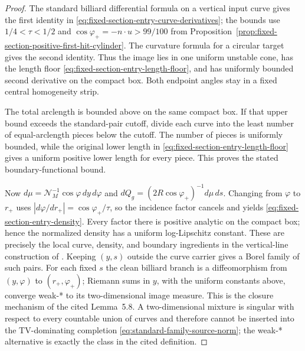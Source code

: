 \documentclass[11pt]{article}
\begin{document}
\begin{proof}
The standard billiard differential formula on a vertical input curve gives
the first identity in
\eqref{eq:fixed-section-entry-curve-derivatives}; the bounds use
$1/4<\tau<1/2$ and $\cos\varphi_+=-n\cdot u>99/100$ from
Proposition~\ref{prop:fixed-section-positive-first-hit-cylinder}.  The
curvature formula for a circular target gives the second identity.  Thus the
image lies in one uniform unstable cone, has the length floor
\eqref{eq:fixed-section-entry-length-floor}, and has uniformly bounded
second derivative on the compact box.  Both endpoint angles stay in a fixed
central homogeneity strip.

The total arclength is bounded above on the same compact box.  If that upper
bound exceeds the standard-pair cutoff, divide each curve into the least
number of equal-arclength pieces below the cutoff.  The number of pieces is
uniformly bounded, while the original lower length in
\eqref{eq:fixed-section-entry-length-floor} gives a uniform positive lower
length for every piece.  This proves the stated boundary-functional bound.

Now
$d\mu=\mathcal N_M^{-1}\cos\varphi\,dy\,d\varphi$ and
$dQ_g=(2R\cos\varphi_+)^{-1}d\mu\,ds$.  Changing from $\varphi$ to $r_+$
uses $|d\varphi/dr_+|=\cos\varphi_+/\tau$, so the incidence factor cancels
and yields \eqref{eq:fixed-section-entry-density}.  Every factor there is
positive analytic on the compact box; hence the normalized density has a
uniform log-Lipschitz constant.  These are precisely the local curve,
density, and boundary ingredients in the vertical-line construction of
\cite[Lemmas~5.1--5.2]{CanestrariHoles}.  Keeping $(y,s)$ outside the curve
carrier gives a Borel family of such pairs.  For each fixed $s$ the clean
billiard branch is a diffeomorphism from $(y,\varphi)$ to
$(r_+,\varphi_+)$; Riemann sums in $y$, with the uniform constants above,
converge weak-* to its two-dimensional image measure.  This is the closure
mechanism of the cited Lemma~5.8.  A two-dimensional mixture is
singular with respect to every countable union of curves and therefore
cannot be inserted into the TV-dominating completion
\eqref{eq:standard-family-source-norm}; the weak-* alternative is exactly
the class in the cited definition.
\end{proof}
\end{document}
